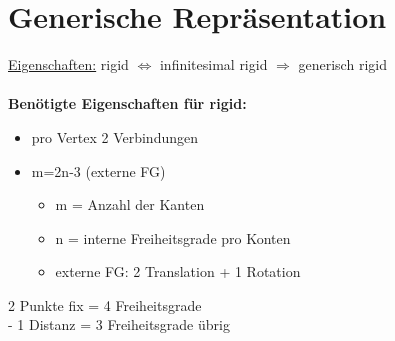 \documentclass[12pt,a4paper]{article}
\begin{document}
\section{Generische Repräsentation}
\underline{Eigenschaften:} rigid $\Leftrightarrow$ infinitesimal rigid $\Rightarrow$ generisch rigid
\\\\
\textbf{Benötigte Eigenschaften für rigid:}
\begin{itemize}
	\item pro Vertex 2 Verbindungen
	\item m=2n-3 (externe FG)
	\begin{itemize}
		\item m = Anzahl der Kanten
		\item n = interne Freiheitsgrade pro Konten
		\item externe FG: 2 Translation + 1 Rotation
	\end{itemize}
\end{itemize}

2 Punkte fix = 4 Freiheitsgrade\\
- 1 Distanz = 3 Freiheitsgrade übrig\\
\end{document}

